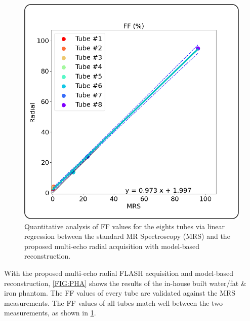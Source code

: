 \documentclass[journal,twoside,web]{ieeecolor}
\begin{document}
\begin{figure}
	\centering
	\includegraphics[width=\columnwidth]{../../figures/tan4.pdf}
	\caption{Quantitative analysis of FF values 
			for the eights tubes via linear regression 
			between the standard MR Spectroscopy (MRS) 
			and the proposed multi-echo radial acquisition 
			with model-based reconstruction.}
	\label{FIG:PHA_LINFIT}
\end{figure}

With the proposed multi-echo radial FLASH acquisition and 
model-based reconstruction, \cref{FIG:PHA} shows the results 
of the in-house built water/fat \& iron phantom. 
The FF values of every tube are validated against 
the MRS measurements. 
The FF values of all tubes match well between the two measurements, 
as shown in \cref{FIG:PHA_LINFIT}. 
\end{document}
